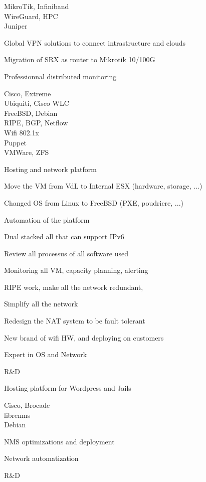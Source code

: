 \documentclass[a4paper,11pt]{cv4tw}%
\begin{document}
	
	{MikroTik, Infiniband\\WireGuard, HPC\\Juniper}
		{
		\begin{missions}
			\item Global VPN solutions to connect intrastructure and clouds
			\item Migration of SRX as router to Mikrotik 10/100G
			\item Professionnal distributed monitoring
		\end{missions}
	}

	{Cisco, Extreme\\Ubiquiti, Cisco WLC\\FreeBSD, Debian\\RIPE, BGP, Netflow\\Wifi 802.1x\\Puppet\\VMWare, ZFS}
		{Hosting and network platform 
		\begin{missions}
			\item Move the VM from VdL to Internal ESX (hardware, storage, ...)
			\item Changed OS from Linux to FreeBSD (PXE, poudriere, ...)
			\item Automation of the platform
			\item Dual stacked all that can support IPv6
			\item Review all processus of all software used
			\item Monitoring all VM, capacity planning, alerting
			\item RIPE work, make all the network redundant,
			\item Simplify all the network
			\item Redesign the NAT system to be fault tolerant
			\item New brand of wifi HW, and deploying on customers
			\item Expert in OS and Network
			\item R\&D 
			\item Hosting platform for Wordpress and Jails
		\end{missions}
	}	

	{Cisco, Brocade\\librenms\\Debian}
		{
		\begin{missions}
			\item NMS optimizations and deployment
			\item Network automatization
			\item R\&D 
		\end{missions}
	}	
\end{document}
